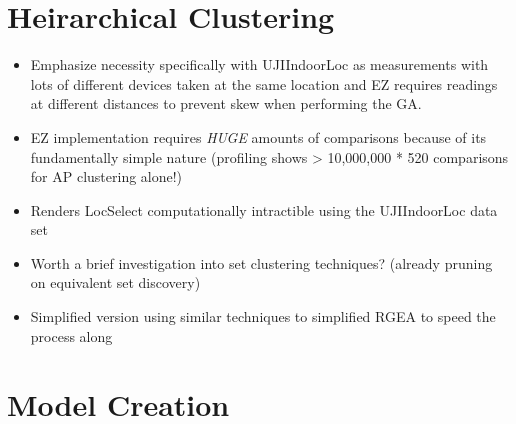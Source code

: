 \documentclass{UoYCSproject}
\begin{document}
		\section{Heirarchical Clustering}
		
			\begin{itemize}
				\item Emphasize necessity specifically with UJIIndoorLoc as measurements with lots of different devices taken at the same location and EZ requires readings at different distances to prevent skew when performing the GA.
				\item EZ implementation requires \emph{HUGE} amounts of comparisons because of its fundamentally simple nature (profiling shows > 10,000,000 * 520 comparisons for AP clustering alone!)
				\item Renders LocSelect computationally intractible using the UJIIndoorLoc data set
				\item Worth a brief investigation into set clustering techniques? (already pruning on equivalent set discovery)
				\item Simplified version using similar techniques to simplified RGEA to speed the process along
			\end{itemize}
		
		\section{Model Creation}
		
\end{document}
